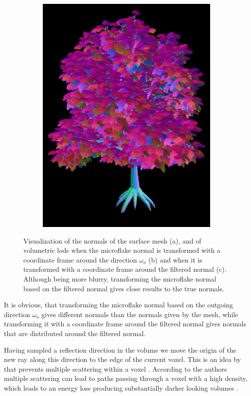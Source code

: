 \begin{figure}[ht]
\begin{subfigure}[b]{0.3\linewidth}
        \includegraphics[width=1\linewidth]{img/normal_map_vndf_normal_aligned.png}
        \caption{}
    \end{subfigure}
    \caption[Visualization of normals with meshes and volumes]{Visualization of the normals of the surface mesh (a), and of volumetric \acsp{lod} when the microflake normal is transformed with a coordinate frame around the direction $\omega_o$ (b) and when it is transformed with a coordinate frame around the filtered normal (c).
             Although being more blurry, transforming the microflake normal based on the filtered normal gives close results to the true normals.}
	\label{fig:tree_normal_maps}
\end{figure}
It is obvious, that transforming the microflake normal based on the outgoing direction $\omega_o$ gives different normals than the normals given by the mesh, while transforming it with a coordinate frame around the filtered normal gives normals that are distributed around the filtered normal.

Having sampled a reflection direction in the volume we move the origin of the new ray along this direction to the edge of the current voxel.
This is an idea by \citeauthor{vicini2021non} that prevents multiple scattering within a voxel \cite{vicini2021non}.
According to the authors multiple scattering can lead to paths passing through a voxel with a high density, which leads to an energy loss producing substantially darker looking volumes \cite{vicini2021non}.